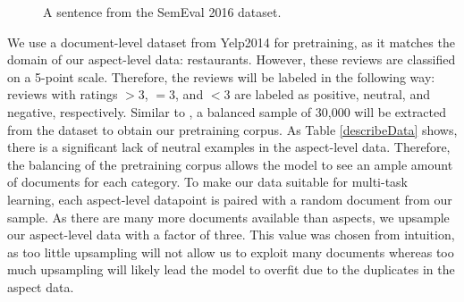 \documentclass[runningheads]{llncs}
\begin{document}
\begin{figure}
    \centering
    \caption{A sentence from the SemEval 2016 dataset.}
    \label{fig:xml}
\end{figure}

We use a document-level dataset from Yelp2014 \cite{Tang2016} for pretraining, as it matches the domain of our aspect-level data: restaurants. However, these reviews are classified on a 5-point scale. Therefore, the reviews will be labeled in the following way: reviews with ratings $>3$, $=3$, and $<3$ are labeled as positive, neutral, and negative, respectively. Similar to \cite{He2018}, a balanced sample of 30,000 will be extracted from the dataset to obtain our pretraining corpus. As Table \ref{describeData} shows, there is a significant lack of neutral examples in the aspect-level data. Therefore, the balancing of the pretraining corpus allows the model to see an ample amount of documents for each category. To make our data suitable for multi-task learning, each aspect-level datapoint is paired with a random document from our sample. As there are many more documents available than aspects, we upsample our aspect-level data with a factor of three. This value was chosen from intuition, as too little upsampling will not allow us to exploit many documents whereas too much upsampling will likely lead the model to overfit due to the duplicates in the aspect data.
\end{document}

